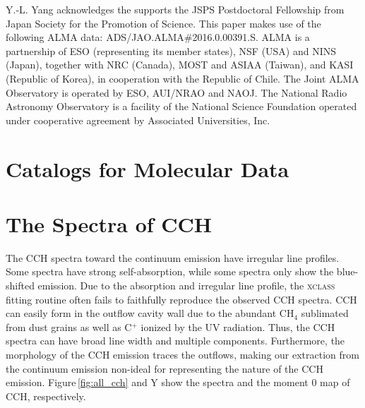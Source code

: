 \documentclass[twocolumn]{aastex62}
\begin{document}
\acknowledgements
Y.-L. Yang acknowledges the supports the JSPS Postdoctoral Fellowship from Japan Society for the Promotion of Science.  This paper makes use of the following ALMA data: ADS/JAO.ALMA\#2016.0.00391.S. ALMA is a partnership of ESO (representing its member states), NSF (USA) and NINS (Japan), together with NRC (Canada), MOST and ASIAA (Taiwan), and KASI (Republic of Korea), in cooperation with the Republic of Chile. The Joint ALMA Observatory is operated by ESO, AUI/NRAO and NAOJ.  The National Radio Astronomy Observatory is a facility of the National Science Foundation operated under cooperative agreement by Associated Universities, Inc.



\appendix
\section{Catalogs for Molecular Data}
\label{sec:catalogs}

\section{The Spectra of CCH}
The CCH spectra toward the continuum emission have irregular line profiles.  Some spectra have strong self-absorption, while some spectra only show the blue-shifted emission.  Due to the absorption and irregular line profile, the \textsc{xclass} fitting routine often fails to faithfully reproduce the observed CCH spectra.  CCH can easily form in the outflow cavity wall due to the abundant CH$_{4}$ sublimated from dust grains as well as C$^+$ ionized by the UV radiation.  Thus, the CCH spectra can have broad line width and multiple components.  Furthermore, the morphology of the CCH emission traces the outflows, making our extraction from the continuum emission non-ideal for representing the nature of the CCH emission.  Figure\,\ref{fig:all_cch} and Y show the spectra and the moment 0 map of CCH, respectively.
\end{document}
